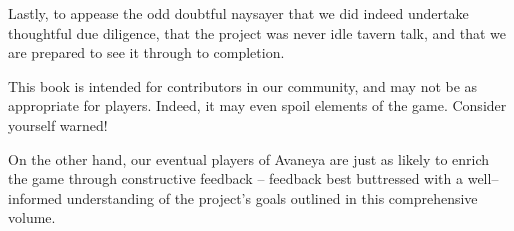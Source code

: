 \item
Lastly, to appease the odd doubtful naysayer that we did indeed undertake thoughtful due diligence, that the project was never idle tavern talk, and that we are prepared to see it through to completion.
\stopitemize

This book is intended for contributors in our community, and may not be as appropriate for players. Indeed, it may even spoil elements of the game. Consider yourself warned!

On the other hand, our eventual players of Avaneya are just as likely to enrich the game through constructive feedback -- feedback best buttressed with a well--informed understanding of the project's goals outlined in this comprehensive volume. 

\StopChapter
